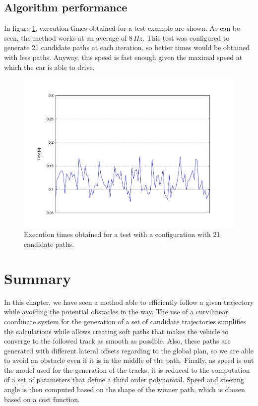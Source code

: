 \subsection{Algorithm performance}\label{ch:chapter07_02_04}

In figure \ref{fig:cp07_times}, execution times obtained for a test example are shown. As can be seen, the method works at an average of $8\,Hz$. This test was configured to generate 21 candidate paths at each iteration, so better times would be obtained with less paths. Anyway, this speed is fast enough given the maximal speed at which the car is able to drive.

\begin{figure}[h!]
  \centering
  \includegraphics[trim=50 50 90 60, clip]{times}
  \caption{Execution times obtained for a test with a configuration with 21 candidate paths.}\label{fig:cp07_times}
\end{figure}

\section{Summary}\label{ch:chapter07_03}

In this chapter, we have seen a method able to efficiently follow a given trajectory while avoiding the potential obstacles in the way. The use of a curvilinear coordinate system for the generation of a set of candidate trajectories simplifies the calculations while allows creating soft paths that makes the vehicle to converge to the followed track as smooth as possible. Also, these paths are generated with different lateral offsets regarding to the global plan, so we are able to avoid an obstacle even if it is in the middle of the path. Finally, as speed is out the model used for the generation of the tracks, it is reduced to the computation of a set of parameters that define a third order polynomial. Speed and steering angle is then computed based on the shape of the winner path, which is chosen based on a cost function.

